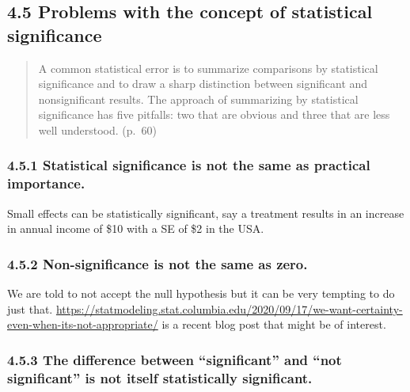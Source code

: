 \documentclass[
]{article}
\begin{document}
\hypertarget{problems-with-the-concept-of-statistical-significance}{%
\subsection{4.5 Problems with the concept of statistical
significance}\label{problems-with-the-concept-of-statistical-significance}}

\begin{quote}
A common statistical error is to summarize comparisons by statistical
significance and to draw a sharp distinction between significant and
nonsignificant results. The approach of summarizing by statistical
significance has five pitfalls: two that are obvious and three that are
less well understood. (p.~60)
\end{quote}

\hypertarget{statistical-significance-is-not-the-same-as-practical-importance.}{%
\subsubsection{4.5.1 Statistical significance is not the same as
practical
importance.}\label{statistical-significance-is-not-the-same-as-practical-importance.}}

Small effects can be statistically significant, say a treatment results
in an increase in annual income of \$10 with a SE of \$2 in the USA.

\hypertarget{non-significance-is-not-the-same-as-zero.}{%
\subsubsection{4.5.2 Non-significance is not the same as
zero.}\label{non-significance-is-not-the-same-as-zero.}}

We are told to not accept the null hypothesis but it can be very
tempting to do just that.
\url{https://statmodeling.stat.columbia.edu/2020/09/17/we-want-certainty-even-when-its-not-appropriate/}
is a recent blog post that might be of interest.

\hypertarget{the-difference-between-significant-and-not-significant-is-not-itself-statistically-significant.}{%
\subsubsection{4.5.3 The difference between ``significant'' and ``not
significant'' is not itself statistically
significant.}\label{the-difference-between-significant-and-not-significant-is-not-itself-statistically-significant.}}
\end{document}
